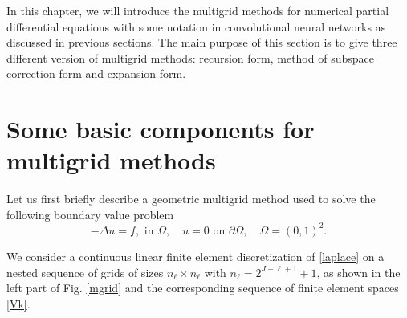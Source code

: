 In this chapter, we will introduce the multigrid 
methods for numerical partial differential equations with
some notation in convolutional neural networks as discussed in 
previous sections. 
The main purpose of this section is to give three different 
version of multigrid methods: recursion form, method of subspace
correction form and expansion form.






\section{Some basic components for multigrid methods}\label{sec:mg}
Let us first briefly describe a geometric multigrid method used to solve the 
following boundary value problem
\begin{equation}
\label{laplace}
-\Delta u = f,  \mbox{ in } \Omega,\quad
 u=0  \mbox{ on } \partial\Omega,\quad
\Omega=(0,1)^2.
\end{equation}

We consider a continuous linear finite element discretization of
\eqref{laplace} on a nested sequence of grids of sizes $n_\ell\times
n_\ell$ with $n_{\ell}=2^{J-\ell+1} + 1$, as shown in the left part of
Fig. \ref{mgrid} and the corresponding sequence of finite
element spaces \eqref{Vk}.

